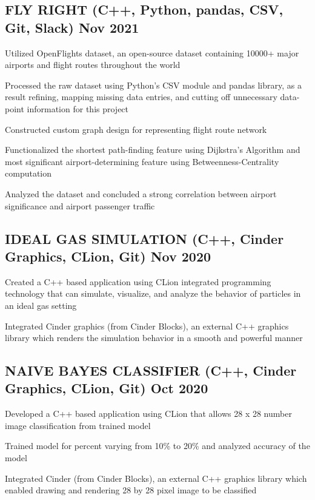 \documentclass[letter,10pt]{article}
\begin{document}
\subsection{{FLY RIGHT  {\normalfont (C++, Python, pandas, CSV, Git, Slack)} \hfill Nov 2021}}
\begin{zitemize}
\item Utilized OpenFlights dataset, an open-source dataset containing 10000+ major airports and flight routes throughout the world
\item Processed the raw dataset using Python's CSV module and pandas library, as a result refining, mapping missing data entries, and cutting off unnecessary data-point information for this project
\item Constructed custom graph design for representing flight route network 
\item Functionalized the shortest path-finding feature using Dijkstra's Algorithm and most significant airport-determining feature using Betweenness-Centrality computation
\item Analyzed the dataset and concluded a strong correlation between airport significance and airport passenger traffic 
\end{zitemize}

\subsection{{IDEAL GAS SIMULATION {\normalfont (C++, Cinder Graphics, CLion, Git)} \hfill Nov 2020}}
\begin{zitemize}
\item Created a C++ based application using CLion integrated programming technology that can simulate, visualize, and analyze the behavior of particles in an ideal gas setting
\item Integrated Cinder graphics (from Cinder Blocks), an external C++ graphics library which renders the simulation behavior in a smooth and
powerful manner
\end{zitemize}

\subsection{{NAIVE BAYES CLASSIFIER {\normalfont (C++, Cinder Graphics, CLion, Git)} \hfill Oct 2020}}
\begin{zitemize}
\item Developed a C++ based application using CLion that allows 28 x 28 number image classification from trained model
\item Trained model for percent varying from 10\% to 20\% and analyzed accuracy of the model
\item Integrated Cinder (from Cinder Blocks), an external C++ graphics library which enabled
drawing and rendering 28 by 28 pixel image to be classified
\end{zitemize}
\end{document}
